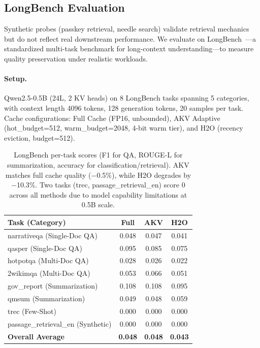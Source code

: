 \documentclass[11pt,a4paper]{article}
\begin{document}
\subsection{LongBench Evaluation}
\label{sec:longbench}

Synthetic probes (passkey retrieval, needle search) validate retrieval mechanics but do not reflect real downstream performance. We evaluate on LongBench~\cite{longbench}---a standardized multi-task benchmark for long-context understanding---to measure quality preservation under realistic workloads.

\paragraph{Setup.} Qwen2.5-0.5B (24L, 2 KV heads) on 8 LongBench tasks spanning 5 categories, with context length 4096 tokens, 128 generation tokens, 20 samples per task. Cache configurations: Full Cache (FP16, unbounded), AKV Adaptive (hot\_budget=512, warm\_budget=2048, 4-bit warm tier), and H2O (recency eviction, budget=512).

\begin{table}[h]
\centering
\begin{tabular}{lccc}
\toprule
\textbf{Task (Category)} & \textbf{Full} & \textbf{AKV} & \textbf{H2O} \\
\midrule
narrativeqa (Single-Doc QA) & 0.048 & 0.047 & 0.041 \\
qasper (Single-Doc QA) & 0.095 & 0.085 & 0.075 \\
hotpotqa (Multi-Doc QA) & 0.028 & 0.026 & 0.022 \\
2wikimqa (Multi-Doc QA) & 0.053 & 0.066 & 0.051 \\
gov\_report (Summarization) & 0.108 & 0.108 & 0.095 \\
qmsum (Summarization) & 0.049 & 0.048 & 0.059 \\
trec (Few-Shot) & 0.000 & 0.000 & 0.000 \\
passage\_retrieval\_en (Synthetic) & 0.000 & 0.000 & 0.000 \\
\midrule
\textbf{Overall Average} & \textbf{0.048} & \textbf{0.048} & \textbf{0.043} \\
\bottomrule
\end{tabular}
\caption{LongBench per-task scores (F1 for QA, ROUGE-L for summarization, accuracy for classification/retrieval). AKV matches full cache quality ($-$0.5\%), while H2O degrades by $-$10.3\%. Two tasks (trec, passage\_retrieval\_en) score 0 across all methods due to model capability limitations at 0.5B scale.}
\label{tab:longbench}
\end{table}
\end{document}
